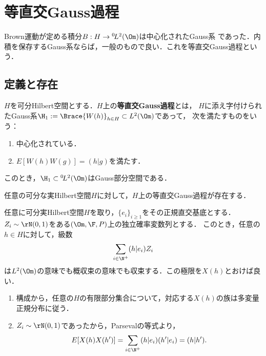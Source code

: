 \documentclass[uplatex,dvipdfmx]{jsreport}
\begin{document}
\section{等直交Gauss過程}


\begin{tcolorbox}[colframe=ForestGreen, colback=ForestGreen!10!white,breakable,colbacktitle=ForestGreen!40!white,coltitle=black,fonttitle=\bfseries\sffamily,
title=]
    Brown運動が定める積分$B:H\to {}^0\!L^2(\Om)$は中心化されたGauss系
    であった．内積を保存するGauss系ならば，一般のもので良い．これを等直交Gauss過程という．
\end{tcolorbox}

\subsection{定義と存在}

\begin{definition}
    $H$を可分Hilbert空間とする．$H$上の\textbf{等直交Gauss過程}とは，
    $H$に添え字付けられたGauss系$\H_1:=\Brace{W(h)}_{h\in H}\subset L^2(\Om)$であって，
    次を満たすものをいう：
    \begin{enumerate}
        \item 中心化されている．
        \item $E[W(h)W(g)]=(h|g)$を満たす．
    \end{enumerate}
    このとき，$\H_1\subset{}^0\!L^2(\Om)$はGauss部分空間である．
\end{definition}

\begin{proposition}
    任意の可分な実Hilbert空間$H$に対して，$H$上の等直交Gauss過程が存在する．
\end{proposition}
\begin{Proof}
    任意に可分実Hilbert空間$H$を取り，$\{e_i\}_{i\ge1}$をその正規直交基底とする．
    $Z_i\sim\rN(0,1)$をある$(\Om,\F,P)$上の独立確率変数列とする．
    このとき，任意の$h\in H$に対して，級数
    \[\sum_{i\in\N^+}(h|e_i)Z_i\]
    は$L^2(\Om)$の意味でも概収束の意味でも収束する．この極限を$X(h)$とおけば良い．
    \begin{enumerate}
        \item 構成から，任意の$H$の有限部分集合について，対応する$X(h)$の族は多変量正規分布に従う．
        \item $Z_i\sim\rN(0,1)$であったから，Parsevalの等式より，
        \[E[X(h)X(h')]=\sum_{i\in\N^+}(h|e_i)(h'|e_i)=(h|h').\]
    \end{enumerate}
\end{Proof}
\end{document}
